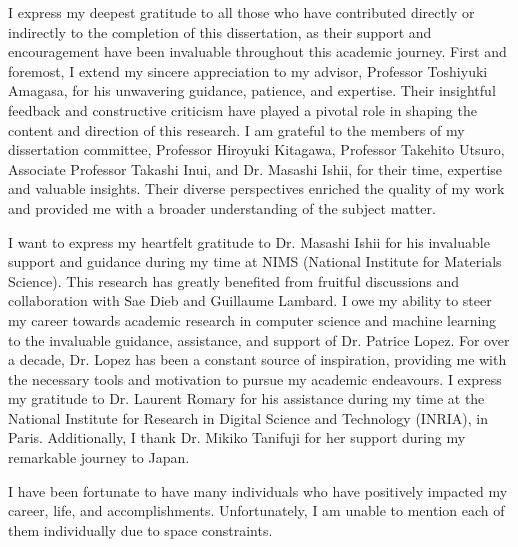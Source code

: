 I express my deepest gratitude to all those who have contributed directly or indirectly to the completion of this dissertation, as their support and encouragement have been invaluable throughout this academic journey.
First and foremost, I extend my sincere appreciation to my advisor, Professor Toshiyuki Amagasa, for his unwavering guidance, patience, and expertise. Their insightful feedback and constructive criticism have played a pivotal role in shaping the content and direction of this research.
I am grateful to the members of my dissertation committee, Professor Hiroyuki Kitagawa, Professor Takehito Utsuro, Associate Professor Takashi Inui, and Dr. Masashi Ishii, for their time, expertise and valuable insights. Their diverse perspectives enriched the quality of my work and provided me with a broader understanding of the subject matter.

I want to express my heartfelt gratitude to Dr. Masashi Ishii for his invaluable support and guidance during my time at NIMS (National Institute for Materials Science).
This research has greatly benefited from fruitful discussions and collaboration with Sae Dieb and Guillaume Lambard. 
I owe my ability to steer my career towards academic research in computer science and machine learning to the invaluable guidance, assistance, and support of Dr. Patrice Lopez. For over a decade, Dr. Lopez has been a constant source of inspiration, providing me with the necessary tools and motivation to pursue my academic endeavours.
I express my gratitude to Dr. Laurent Romary for his assistance during my time at the National Institute for Research in Digital Science and Technology (INRIA), in Paris. Additionally, I thank Dr. Mikiko Tanifuji for her support during my remarkable journey to Japan. 

I have been fortunate to have many individuals who have positively impacted my career, life, and accomplishments. Unfortunately, I am unable to mention each of them individually due to space constraints.